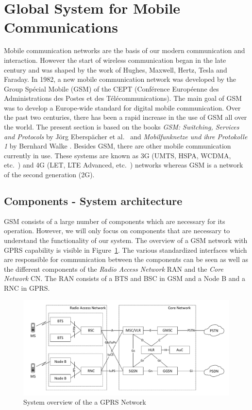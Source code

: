 \documentclass[master,english]{hgbthesis}
\begin{document}
\section{Global System for Mobile Communications}
Mobile communication networks are the basis of our modern communication and interaction. However the start of wireless communication began in the late  century and was shaped by the work of Hughes, Maxwell, Hertz, Tesla and Faraday.
In 1982, a new mobile communication network was developed by the Group Spécial Mobile (GSM) of the CEPT (Conférence Européenne des Administrations des Postes et des Télécommunications). The main goal of GSM was to develop a Europe-wide standard for digital mobile communication. Over the past two centuries, there has been a rapid increase in the use of GSM all over the world. The present section is based on the books \emph{GSM: Switching, Services and Protocols} by Jörg Eberspächer et al.\ \cite{Eberspaecher2001} and \emph{Mobilfunknetze und ihre Protokolle 1} by Bernhard Walke \cite{Walke2001}.
Besides GSM, there are other mobile communication currently in use. These systems are known as 3G (UMTS, HSPA, WCDMA, etc.\ ) and 4G (LET, LTE Advanced, etc.\ ) networks whereas GSM is a network of the second generation (2G).
\subsection{Components - System architecture}
GSM consists of a large number of components which are necessary for its operation. However, we will only focus on components that are necessary to understand the functionality of our system. The overview of a GSM network with GPRS capability is visible in Figure~\ref{fig:GSMNetwork}. The various standardized interfaces which are responsible for communication between the components can be seen as well as the different components of the \emph{Radio Access Network} RAN and the \emph{Core Network} CN. The RAN consists of a BTS and BSC in GSM and a Node B and a RNC in GPRS.
\begin{figure}
	\centering
	\includegraphics[width=\linewidth]{./images/GSMNetwork}
	\caption{System overview of the a GPRS Network}
	\label{fig:GSMNetwork}
\end{figure}
\end{document}
